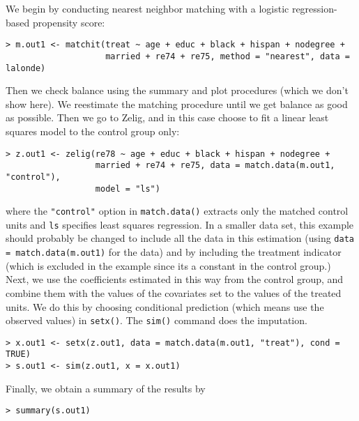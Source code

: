 \begin{description}
  We begin by conducting nearest neighbor matching with a logistic
  regression-based propensity score:
\begin{verbatim}
> m.out1 <- matchit(treat ~ age + educ + black + hispan + nodegree + 
                    married + re74 + re75, method = "nearest", data = lalonde)
\end{verbatim}
  Then we check balance using the summary and plot procedures (which
  we don't show here).  We reestimate the matching procedure until we
  get balance as good as possible.  Then we go to Zelig, and in this
  case choose to fit a linear least squares model to the control group
  only:
\begin{verbatim}
> z.out1 <- zelig(re78 ~ age + educ + black + hispan + nodegree + 
                  married + re74 + re75, data = match.data(m.out1, "control"), 
                  model = "ls")
\end{verbatim}
  where the {\tt "control"} option in {\tt match.data()} extracts only
  the matched control units and {\tt ls} specifies least squares
  regression.  In a smaller data set, this example should probably be
  changed to include all the data in this estimation (using
  \texttt{data = match.data(m.out1)} for the data) and by including
  the treatment indicator (which is excluded in the example since its
  a constant in the control group.)  Next, we use the coefficients
  estimated in this way from the control group, and combine them with
  the values of the covariates set to the values of the treated units.
  We do this by choosing conditional prediction (which means use the
  observed values) in \texttt{setx()}.  The {\tt sim()} command does
  the imputation.
\begin{verbatim}
> x.out1 <- setx(z.out1, data = match.data(m.out1, "treat"), cond = TRUE)
> s.out1 <- sim(z.out1, x = x.out1)
\end{verbatim}
Finally, we obtain a summary of the results by 
\begin{verbatim}
> summary(s.out1)
\end{verbatim}


\end{description}
